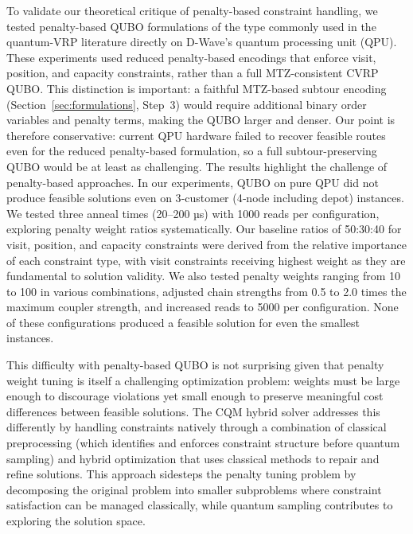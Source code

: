 \documentclass[preprint,3p,12pt,authoryear]{elsarticle}
\begin{document}
To validate our theoretical critique of penalty-based constraint handling, we tested penalty-based QUBO formulations of the type commonly used in the quantum-VRP literature \citep{okada2019efficient, cattelan2024modeling} directly on D-Wave's quantum processing unit (QPU). {\color{red}These experiments used reduced penalty-based encodings that enforce visit, position, and capacity constraints, rather than a full MTZ-consistent CVRP QUBO. This distinction is important: a faithful MTZ-based subtour encoding (Section~\ref{sec:formulations}, Step~3) would require additional binary order variables and penalty terms, making the QUBO larger and denser. Our point is therefore conservative: current QPU hardware failed to recover feasible routes even for the reduced penalty-based formulation, so a full subtour-preserving QUBO would be at least as challenging.} The results highlight the challenge of penalty-based approaches. In our experiments, QUBO on pure QPU did not produce feasible solutions even on 3‑customer (4‑node including depot) instances. We tested three anneal times (20–200 µs) with 1000 reads per configuration, exploring penalty weight ratios systematically. Our baseline ratios of 50:30:40 for visit, position, and capacity constraints were derived from the relative importance of each constraint type, with visit constraints receiving highest weight as they are fundamental to solution validity. We also tested penalty weights ranging from 10 to 100 in various combinations, adjusted chain strengths from 0.5 to 2.0 times the maximum coupler strength, and increased reads to 5000 per configuration. None of these configurations produced a feasible solution for even the smallest instances. 

This difficulty with penalty-based QUBO is not surprising given that penalty weight tuning is itself a challenging optimization problem: weights must be large enough to discourage violations yet small enough to preserve meaningful cost differences between feasible solutions. The CQM hybrid solver addresses this differently by handling constraints natively through a combination of classical preprocessing (which identifies and enforces constraint structure before quantum sampling) and hybrid optimization that uses classical methods to repair and refine solutions. This approach sidesteps the penalty tuning problem by decomposing the original problem into smaller subproblems where constraint satisfaction can be managed classically, while quantum sampling contributes to exploring the solution space.
\end{document}
